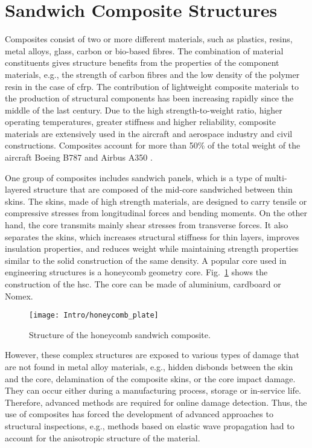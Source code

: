 \section{Sandwich Composite Structures}
\label{sec:scs}

Composites consist of two or more different materials, such as plastics, resins, metal alloys, glass, carbon or bio-based fibres. The combination of material constituents gives  structure benefits from the properties of the component materials, e.g., the strength of carbon fibres and the low density of the polymer resin in the case of \ac{cfrp}.
The contribution of lightweight composite materials to the production of structural components has been increasing rapidly since the middle of the last century.
Due to the high strength-to-weight ratio, higher operating temperatures, greater stiffness and higher
reliability, composite materials are extensively used in the aircraft and aerospace industry and civil constructions.
Composites account for more than 50\% of the total weight of the aircraft Boeing B787 and Airbus A350 \cite{giurgiutiu2015structural}.

One group of composites includes sandwich panels, which is a type of multi-layered structure that are composed of the mid-core sandwiched between thin skins.
The skins, made of high strength materials, are designed to carry tensile or compressive stresses from longitudinal forces and bending moments.
On the other hand, the core transmits mainly shear stresses from transverse forces.
It also separates the skins, which increases structural stiffness for thin layers, improves insulation properties, and reduces weight while maintaining strength properties similar to the solid construction of the same density.
A popular core used in engineering structures is a honeycomb geometry core.
Fig.~\ref{fig:hcp} shows the construction of the \ac{hsc}.
The core can be made of aluminium, cardboard or Nomex. 
\begin{figure}[H] %
	\begin{center}
		\texttt{[image: Intro/honeycomb\_plate]}
		\caption{
			\label{fig:hcp} Structure of the honeycomb sandwich composite.}
		\vspace{-0.5cm}
	\end{center}
\end{figure}

However, these complex structures are exposed to various types of damage that are not found in metal alloy materials, e.g., hidden disbonds between the skin and the core, delamination of the composite skins, or the core impact damage.
They can occur either during a manufacturing process, storage or in-service life.
Therefore, advanced methods are required for online damage detection.
Thus, the use of composites has forced the development of advanced approaches to structural inspections, e.g., methods based on elastic wave propagation had to account for the anisotropic structure of the material.